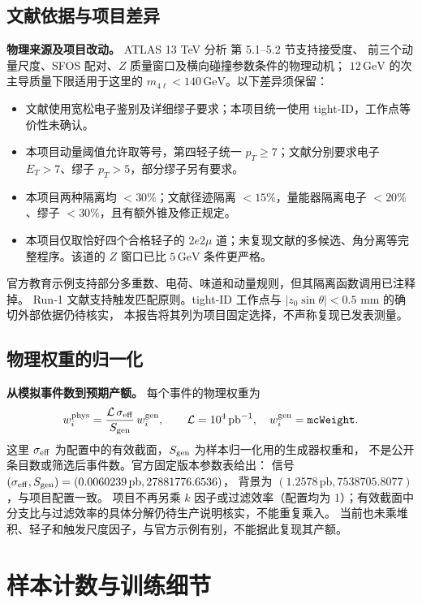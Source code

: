 \documentclass[11pt,a4paper,fontset=fandol,scheme=plain]{ctexart}
\newcommand{\gev}{\,\mathrm{GeV}}
\begin{document}
\subsection{文献依据与项目差异}
\textbf{物理来源及项目改动。} ATLAS 13 TeV 分析\cite{ATLAS13} 第 5.1--5.2 节支持接受度、
前三个动量尺度、SFOS 配对、$Z$ 质量窗口及横向碰撞参数条件的物理动机；
$12\gev$ 的次主导质量下限适用于这里的 $m_{4\ell}<140\gev$。以下差异须保留：
\begin{itemize}[itemsep=1pt,topsep=2pt]
\item 文献使用宽松电子鉴别及详细缪子要求；本项目统一使用 tight-ID，工作点等价性未确认。
\item 本项目动量阈值允许取等号，第四轻子统一 $p_T\geq7$；文献分别要求电子 $E_T>7$、缪子 $p_T>5$，部分缪子另有要求。
\item 本项目两种隔离均 $<30\%$；文献径迹隔离 $<15\%$，量能器隔离电子 $<20\%$、缪子 $<30\%$，且有额外锥及修正规定。
\item 本项目仅取恰好四个合格轻子的 $2e2\mu$ 道；未复现文献的多候选、角分离等完整程序。该道的 $Z$ 窗口已比 $5\gev$ 条件更严格。
\end{itemize}
官方教育示例\cite{HZZCuts,HZZAnalysis}支持部分多重数、电荷、味道和动量规则，但其隔离函数调用已注释掉。
Run-1 文献\cite{ATLASRun1}支持触发匹配原则。tight-ID 工作点与 $|z_0\sin\theta|<0.5$ mm 的确切外部依据仍待核实，
本报告将其列为项目固定选择，不声称复现已发表测量。
\subsection{物理权重的归一化}
\label{app:weights}
\textbf{从模拟事件数到预期产额。} 每个事件的物理权重为
\[
 w_i^{\rm phys}=\frac{\mathcal L\,\sigma_{\rm eff}}{S_{\rm gen}}\,w_i^{\rm gen},
 \qquad \mathcal L=10^4\,\mathrm{pb}^{-1},\quad w_i^{\rm gen}=\texttt{mcWeight}.
\]
这里 $\sigma_{\rm eff}$ 为配置中的有效截面，$S_{\rm gen}$ 为样本归一化用的生成器权重和，
不是公开条目数或筛选后事件数。官方固定版本参数表\cite{SampleInfo}给出：
信号 $(\sigma_{\rm eff},S_{\rm gen})=(0.0060239\,\mathrm{pb},27881776.6536)$，
背景为 $(1.2578\,\mathrm{pb},7538705.8077)$，与项目配置一致。
项目不再另乘 $k$ 因子或过滤效率（配置均为 1）；有效截面中分支比与过滤效率的具体分解仍待生产说明核实，不能重复乘入。
当前也未乘堆积、轻子和触发尺度因子，与官方示例\cite{HZZAnalysis}有别，不能据此复现其产额。
\FloatBarrier

\section{样本计数与训练细节}
\end{document}

